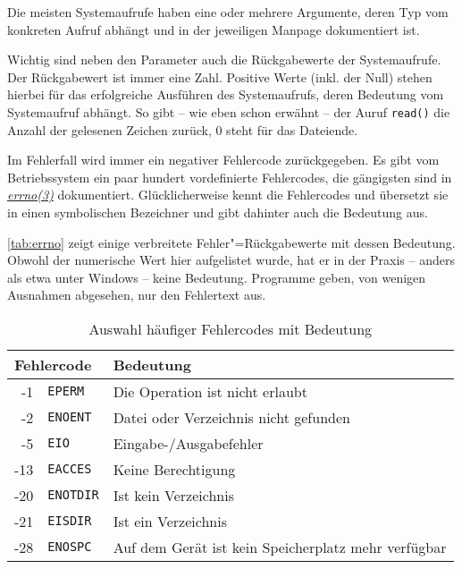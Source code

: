 
Die meisten Systemaufrufe haben eine oder mehrere Argumente, deren Typ vom konkreten Aufruf abhängt
und in der jeweiligen Manpage dokumentiert ist.

Wichtig sind neben den Parameter auch die Rückgabewerte der Systemaufrufe. Der Rückgabewert ist
immer eine Zahl. Positive Werte (inkl. der Null) stehen hierbei für das erfolgreiche Ausführen
des Systemaufrufs, deren Bedeutung vom Systemaufruf abhängt. So gibt -- wie eben schon erwähnt --
der Auruf \texttt{read()} die Anzahl der gelesenen Zeichen zurück, 0 steht für das Dateiende. 

Im Fehlerfall wird immer ein negativer Fehlercode zurückgegeben. Es gibt vom Betriebssystem ein 
paar hundert vordefinierte Fehlercodes, die gängigsten sind in
\href{http://man7.org/linux/man-pages/man3/errno.3.html}{\emph{errno(3)}} dokumentiert.
Glücklicherweise kennt \strace{} die Fehlercodes und übersetzt sie in einen symbolischen Bezeichner
und gibt dahinter auch die Bedeutung aus.

\autoref{tab:errno} zeigt einige verbreitete Fehler"=Rückgabewerte mit dessen Bedeutung. Obwohl der
numerische Wert hier aufgelistet wurde, hat er in der Praxis -- anders als etwa unter Windows --
keine Bedeutung. Programme geben, von wenigen Ausnahmen abgesehen, nur den Fehlertext aus.

\begin{table}[b]
  \centering\small
  \begin{tabular}{|r@{~~}l|p{5.2cm}|}
    \hline
    \multicolumn{2}{|l|}{\textbf{Fehlercode}}        & \textbf{Bedeutung} \\
    \hline
    -1      & \texttt{EPERM}     & Die Operation ist nicht erlaubt \\
    -2      & \texttt{ENOENT}    & Datei oder Verzeichnis nicht gefunden \\
    -5      & \texttt{EIO}       & Eingabe-/Ausgabefehler \\
    -13     & \texttt{EACCES}    & Keine Berechtigung \\
    -20     & \texttt{ENOTDIR}   & Ist kein Verzeichnis \\
    -21     & \texttt{EISDIR}    & Ist ein Verzeichnis \\
    -28     & \texttt{ENOSPC}    & Auf dem Gerät ist kein Speicherplatz mehr verfügbar \\
    \hline
  \end{tabular}
  \caption{Auswahl häufiger Fehlercodes mit Bedeutung}
  \label{tab:errno}
\end{table}
